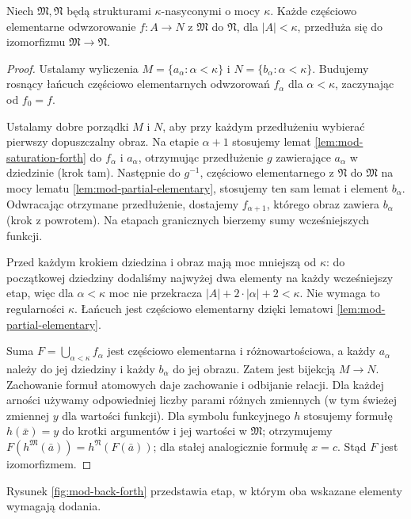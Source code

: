 \begin{twierdzenie}
\label{thm:mod-saturation-back-forth}
Niech $\mathfrak M,\mathfrak N$ będą strukturami
$\kappa$-nasyconymi o mocy $\kappa$.
Każde częściowo elementarne odwzorowanie $f:A\to N$
z $\mathfrak M$ do $\mathfrak N$, dla $|A|<\kappa$,
przedłuża się do izomorfizmu $\mathfrak M\to\mathfrak N$.
\end{twierdzenie}
\begin{proof}
Ustalamy wyliczenia $M=\{a_\alpha:\alpha<\kappa\}$
i $N=\{b_\alpha:\alpha<\kappa\}$.
Budujemy rosnący łańcuch częściowo elementarnych
odwzorowań $f_\alpha$ dla $\alpha<\kappa$,
zaczynając od $f_0=f$.

Ustalamy dobre porządki $M$ i $N$, aby przy każdym
przedłużeniu wybierać pierwszy dopuszczalny obraz.
Na etapie $\alpha+1$ stosujemy lemat
\ref{lem:mod-saturation-forth} do $f_\alpha$ i $a_\alpha$,
otrzymując przedłużenie $g$ zawierające $a_\alpha$
w dziedzinie (krok tam). Następnie do $g^{-1}$,
częściowo elementarnego z $\mathfrak N$ do $\mathfrak M$
na mocy lematu \ref{lem:mod-partial-elementary},
stosujemy ten sam lemat i element $b_\alpha$.
Odwracając otrzymane przedłużenie, dostajemy
$f_{\alpha+1}$, którego obraz zawiera $b_\alpha$
(krok z powrotem). Na etapach granicznych bierzemy
sumy wcześniejszych funkcji.

Przed każdym krokiem dziedzina i obraz mają moc
mniejszą od $\kappa$: do początkowej dziedziny
dodaliśmy najwyżej dwa elementy na każdy wcześniejszy
etap, więc dla $\alpha<\kappa$ moc nie przekracza
$|A|+2\cdot|\alpha|+2<\kappa$.
Nie wymaga to regularności $\kappa$.
Łańcuch jest częściowo elementarny dzięki lematowi
\ref{lem:mod-partial-elementary}.

Suma $F=\bigcup_{\alpha<\kappa}f_\alpha$ jest
częściowo elementarna i różnowartościowa, a każdy
$a_\alpha$ należy do jej dziedziny i każdy $b_\alpha$
do jej obrazu. Zatem jest bijekcją $M\to N$.
Zachowanie formuł atomowych daje zachowanie i odbijanie
relacji. Dla każdej arności używamy odpowiedniej liczby
parami różnych zmiennych (w tym świeżej zmiennej $y$
dla wartości funkcji). Dla symbolu funkcyjnego $h$ stosujemy formułę
$h(\bar x)=y$ do krotki argumentów i jej wartości
w $\mathfrak M$; otrzymujemy
$F(h^{\mathfrak M}(\bar a))=h^{\mathfrak N}(F(\bar a))$; dla stałej analogicznie formułę $x=c$.
Stąd $F$ jest izomorfizmem.
\end{proof}

Rysunek \ref{fig:mod-back-forth} przedstawia etap,
w którym oba wskazane elementy wymagają dodania.

